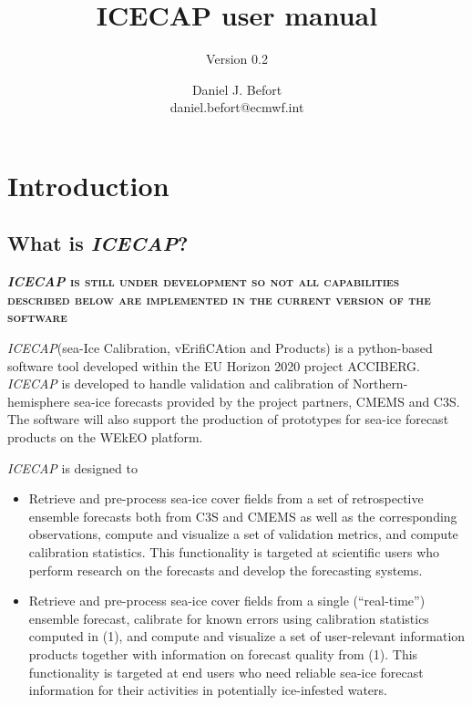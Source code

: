 \documentclass[DIV=10, parskip=full]{scrreprt}
\title{ICECAP user manual}
\subtitle{Version 0.2}
\author{Daniel J. Befort \\ daniel.befort@ecmwf.int}
\newcommand{\ice}{\textit{ICECAP}\xspace}
\newcommand{\highlight}[1]{\textsc{\textbf{#1}}}
\begin{document}
\maketitle

\tableofcontents

\chapter{Introduction}

\section{What is \ice?}
\highlight{\ice is still under development so not all capabilities described below are implemented in the current version of the software}

\ice (sea-Ice Calibration, vErifiCAtion and Products) is a python-based software tool developed within the EU Horizon 2020 project ACCIBERG. \ice is developed to handle validation and calibration of Northern-hemisphere sea-ice forecasts provided by the project partners, CMEMS and C3S. The software will also support the production of prototypes for sea-ice forecast products on the WEkEO platform. 

\ice is designed to 
\begin{itemize}
	\item Retrieve and pre-process sea-ice cover fields from a set of retrospective ensemble forecasts both from C3S and CMEMS as well as the corresponding observations, compute and visualize a set of validation metrics, and compute calibration statistics. This functionality is targeted at scientific users who perform research on the forecasts and develop the forecasting systems.
	\item Retrieve and pre-process sea-ice cover fields from a single (“real-time”) ensemble forecast, calibrate for known errors using calibration statistics computed in (1), and compute and visualize a set of user-relevant information products together with information on forecast quality from (1). This functionality is targeted at end users who need reliable sea-ice forecast information for their activities in potentially ice-infested waters.
\end{itemize}
\end{document}
